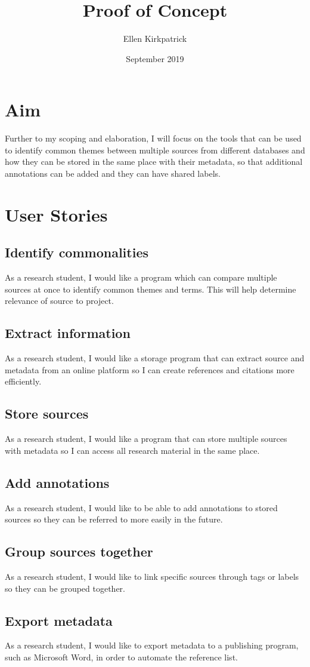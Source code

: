 \documentclass{article}
\title{Proof of Concept}
\author{Ellen Kirkpatrick }
\date{September 2019}
\begin{document}
\maketitle

\section{Aim}
Further to my scoping and elaboration, I will focus on the tools that can be used to identify common themes between multiple sources from different databases and how they can be stored in the same place with their metadata, so that additional annotations can be added and they can have shared labels.

\section{User Stories}
\subsection{Identify commonalities}
As a research student, I would like a program which can compare multiple sources at once to identify common themes and terms. This will help determine relevance of source to project.
\subsection{Extract information}
As a research student, I would like a storage program that can extract source and metadata from an online platform so I can create references and citations more efficiently.
\subsection{Store sources}
As a research student, I would like a program that can store multiple sources with metadata so I can access all research material in the same place. 
\subsection{Add annotations}
As a research student, I would like to be able to add annotations to stored sources so they can be referred to more easily in the future.
\subsection{Group sources together}
As a research student, I would like to link specific sources through tags or labels so they can be grouped together. 
\subsection{Export metadata}
As a research student, I would like to export metadata to a publishing program, such as Microsoft Word, in order to automate the reference list. 
\end{document}
